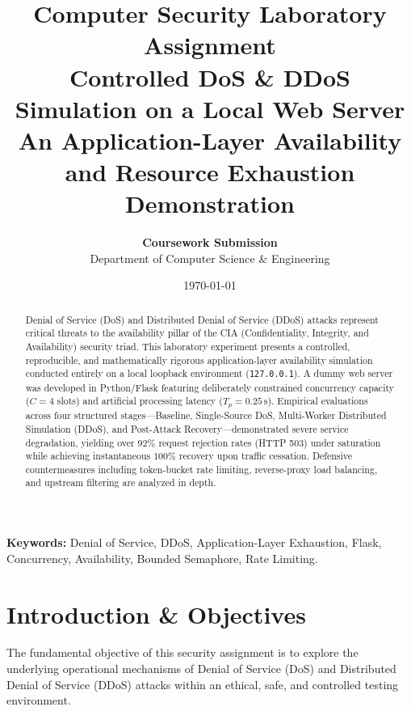 \documentclass[11pt,a4paper]{article}
\title{\vspace{-1.5cm}
    \textbf{\Large Computer Security Laboratory Assignment}\\[0.3cm]
    \textbf{\LARGE Controlled DoS \& DDoS Simulation on a Local Web Server}\\[0.2cm]
    \large An Application-Layer Availability and Resource Exhaustion Demonstration
}
\author{\textbf{Coursework Submission} \\ Department of Computer Science \& Engineering}
\date{\today}
\begin{document}
\maketitle

\begin{abstract}
Denial of Service (DoS) and Distributed Denial of Service (DDoS) attacks represent critical threats to the availability pillar of the CIA (Confidentiality, Integrity, and Availability) security triad. This laboratory experiment presents a controlled, reproducible, and mathematically rigorous application-layer availability simulation conducted entirely on a local loopback environment (\texttt{127.0.0.1}). A dummy web server was developed in Python/Flask featuring deliberately constrained concurrency capacity ($C = 4$ slots) and artificial processing latency ($T_p = 0.25\,\text{s}$). Empirical evaluations across four structured stages---Baseline, Single-Source DoS, Multi-Worker Distributed Simulation (DDoS), and Post-Attack Recovery---demonstrated severe service degradation, yielding over $92\%$ request rejection rates (HTTP 503) under saturation while achieving instantaneous $100\%$ recovery upon traffic cessation. Defensive countermeasures including token-bucket rate limiting, reverse-proxy load balancing, and upstream filtering are analyzed in depth.
\end{abstract}

\vspace{0.3cm}
\noindent\textbf{Keywords:} Denial of Service, DDoS, Application-Layer Exhaustion, Flask, Concurrency, Availability, Bounded Semaphore, Rate Limiting.

\section{Introduction \& Objectives}
The fundamental objective of this security assignment is to explore the underlying operational mechanisms of Denial of Service (DoS) and Distributed Denial of Service (DDoS) attacks within an ethical, safe, and controlled testing environment. 
\end{document}
